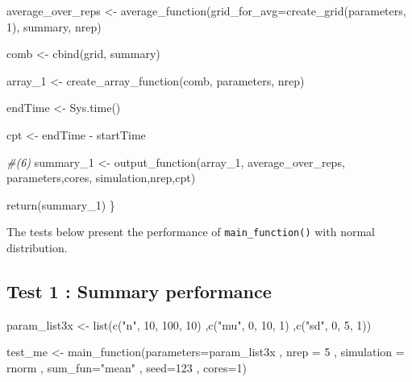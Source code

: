 \documentclass[11pt,a4paper]{article}
\newenvironment{Shaded}{\begin{snugshade}}{\end{snugshade}}
\newcommand{\AttributeTok}[1]{\textcolor[rgb]{0.77,0.63,0.00}{#1}}
\newcommand{\CommentTok}[1]{\textcolor[rgb]{0.56,0.35,0.01}{\textit{#1}}}
\newcommand{\DecValTok}[1]{\textcolor[rgb]{0.00,0.00,0.81}{#1}}
\newcommand{\FunctionTok}[1]{\textcolor[rgb]{0.00,0.00,0.00}{#1}}
\newcommand{\NormalTok}[1]{#1}
\newcommand{\OtherTok}[1]{\textcolor[rgb]{0.56,0.35,0.01}{#1}}
\newcommand{\SpecialCharTok}[1]{\textcolor[rgb]{0.00,0.00,0.00}{#1}}
\newcommand{\StringTok}[1]{\textcolor[rgb]{0.31,0.60,0.02}{#1}}
\begin{document}
\begin{Shaded}
\begin{Highlighting}[]
\NormalTok{  average\_over\_reps }\OtherTok{\textless{}{-}} \FunctionTok{average\_function}\NormalTok{(}\AttributeTok{grid\_for\_avg=}\FunctionTok{create\_grid}\NormalTok{(parameters, }\DecValTok{1}\NormalTok{),}
\NormalTok{                                        summary, nrep)}
  
\NormalTok{  comb }\OtherTok{\textless{}{-}} \FunctionTok{cbind}\NormalTok{(grid, summary) }
  
\NormalTok{  array\_1 }\OtherTok{\textless{}{-}} \FunctionTok{create\_array\_function}\NormalTok{(comb, parameters, nrep) }
  
\NormalTok{  endTime }\OtherTok{\textless{}{-}} \FunctionTok{Sys.time}\NormalTok{()}
  
\NormalTok{  cpt }\OtherTok{\textless{}{-}}\NormalTok{ endTime }\SpecialCharTok{{-}}\NormalTok{ startTime}
  
  \CommentTok{\#(6)}
\NormalTok{  summary\_1 }\OtherTok{\textless{}{-}} \FunctionTok{output\_function}\NormalTok{(array\_1,}
\NormalTok{                               average\_over\_reps,}
\NormalTok{                               parameters,cores,}
\NormalTok{                               simulation,nrep,cpt)}
  
\FunctionTok{return}\NormalTok{(summary\_1)}
\NormalTok{\}}
\end{Highlighting}
\end{Shaded}

The tests below present the performance of \texttt{main\_function()}
with normal distribution.

\hypertarget{test-1-summary-performance}{%
\subsection{Test 1 : Summary
performance}\label{test-1-summary-performance}}

\begin{Shaded}
\begin{Highlighting}[]
\NormalTok{param\_list3x }\OtherTok{\textless{}{-}} \FunctionTok{list}\NormalTok{(}\FunctionTok{c}\NormalTok{(}\StringTok{"n"}\NormalTok{, }\DecValTok{10}\NormalTok{, }\DecValTok{100}\NormalTok{, }\DecValTok{10}\NormalTok{)}
\NormalTok{                     ,}\FunctionTok{c}\NormalTok{(}\StringTok{"mu"}\NormalTok{, }\DecValTok{0}\NormalTok{, }\DecValTok{10}\NormalTok{, }\DecValTok{1}\NormalTok{)}
\NormalTok{                     ,}\FunctionTok{c}\NormalTok{(}\StringTok{"sd"}\NormalTok{, }\DecValTok{0}\NormalTok{, }\DecValTok{5}\NormalTok{, }\DecValTok{1}\NormalTok{))}

\NormalTok{test\_me }\OtherTok{\textless{}{-}} \FunctionTok{main\_function}\NormalTok{(}\AttributeTok{parameters=}\NormalTok{param\_list3x}
\NormalTok{              , }\AttributeTok{nrep =} \DecValTok{5}
\NormalTok{              , }\AttributeTok{simulation =}\NormalTok{ rnorm}
\NormalTok{              , }\AttributeTok{sum\_fun=}\StringTok{"mean"}
\NormalTok{              , }\AttributeTok{seed=}\DecValTok{123} 
\NormalTok{              , }\AttributeTok{cores=}\DecValTok{1}\NormalTok{)}
\end{Highlighting}
\end{Shaded}
\end{document}
